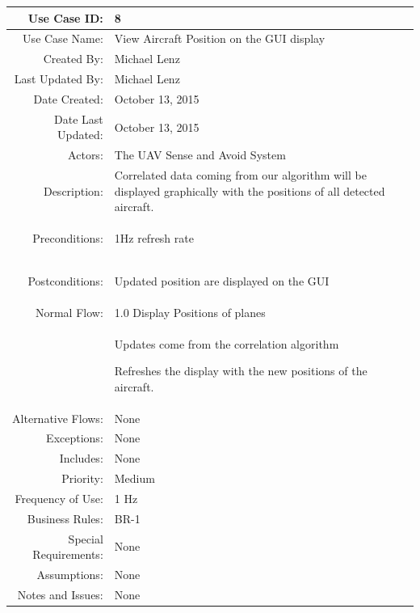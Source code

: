 \documentclass[12pt,oneside,letterpaper]{article}
\newenvironment{packed_enumerate}{ %
\vspace{-7mm}
\begin{enumerate}
  \setlength{\itemsep}{0pt}
  \setlength{\parskip}{0pt}
  \setlength{\parsep}{0pt}
}{\end{enumerate}
\vspace{-8mm}}
\begin{document}
\begin{longtable}{|r|p{3.8in}|}
\hline
Use Case ID:&8\\
\hline
Use Case Name:&View Aircraft Position on the GUI display\\
\hline
Created By:&Michael Lenz\\
\hline
Last Updated By:&Michael Lenz\\
\hline
Date Created:&October 13, 2015\\
\hline
Date Last Updated:&October 13, 2015\\
\hline
Actors:&The UAV Sense and Avoid System\\
\hline
Description:&Correlated  data coming from our algorithm will be displayed graphically with the positions of all detected aircraft.\\
\hline
Preconditions:&
\begin{packed_enumerate}
\item 1Hz refresh rate
\end{packed_enumerate}\\
\hline
Postconditions:&
\begin{packed_enumerate}
\item Updated position are displayed on the GUI
\end{packed_enumerate}\\
\hline
Normal Flow:&1.0 Display Positions of planes\\
&  %
\begin{packed_enumerate}
\item Updates come from the correlation algorithm
\item Refreshes the display with the new positions of the aircraft.
\end{packed_enumerate}\\
\hline
Alternative Flows:&None\\
\hline
Exceptions:&None\\
\hline
Includes:&None\\
\hline
Priority:&Medium\\
\hline
Frequency of Use:&1 Hz\\
\hline
Business Rules:&BR-1\\
\hline
Special Requirements:&None\\
\hline
Assumptions:&None\\
\hline
Notes and Issues:&
None\\
\hline
\end{longtable}
\end{document}
